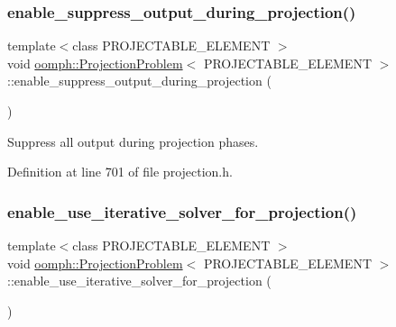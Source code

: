 \subsubsection{\texorpdfstring{enable\+\_\+suppress\+\_\+output\+\_\+during\+\_\+projection()}{enable\_suppress\_output\_during\_projection()}}
{\footnotesize\ttfamily template$<$class P\+R\+O\+J\+E\+C\+T\+A\+B\+L\+E\+\_\+\+E\+L\+E\+M\+E\+NT $>$ \\
void \hyperlink{classoomph_1_1ProjectionProblem}{oomph\+::\+Projection\+Problem}$<$ P\+R\+O\+J\+E\+C\+T\+A\+B\+L\+E\+\_\+\+E\+L\+E\+M\+E\+NT $>$\+::enable\+\_\+suppress\+\_\+output\+\_\+during\+\_\+projection (\begin{DoxyParamCaption}{ }\end{DoxyParamCaption})\hspace{0.3cm}{\ttfamily [inline]}}



Suppress all output during projection phases. 



Definition at line 701 of file projection.\+h.

\mbox{\label{classoomph_1_1ProjectionProblem_aefda55d76d58a951ef6714cbb998e358}} 
\subsubsection{\texorpdfstring{enable\+\_\+use\+\_\+iterative\+\_\+solver\+\_\+for\+\_\+projection()}{enable\_use\_iterative\_solver\_for\_projection()}}
{\footnotesize\ttfamily template$<$class P\+R\+O\+J\+E\+C\+T\+A\+B\+L\+E\+\_\+\+E\+L\+E\+M\+E\+NT $>$ \\
void \hyperlink{classoomph_1_1ProjectionProblem}{oomph\+::\+Projection\+Problem}$<$ P\+R\+O\+J\+E\+C\+T\+A\+B\+L\+E\+\_\+\+E\+L\+E\+M\+E\+NT $>$\+::enable\+\_\+use\+\_\+iterative\+\_\+solver\+\_\+for\+\_\+projection (\begin{DoxyParamCaption}{ }\end{DoxyParamCaption})\hspace{0.3cm}{\ttfamily [inline]}}



